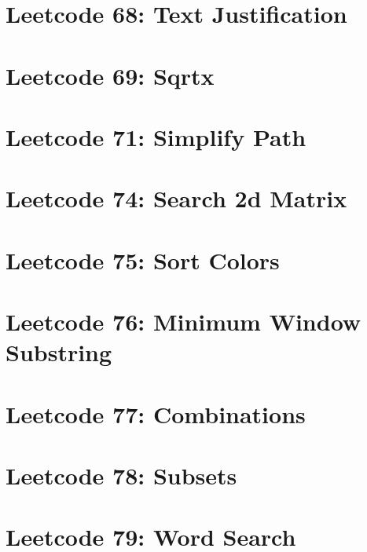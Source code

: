 \documentclass{article}
\begin{document}
\section*{Leetcode 68: Text Justification}

\pagebreak 

\section*{Leetcode 69: Sqrtx}

\pagebreak 

\section*{Leetcode 71: Simplify Path}

\pagebreak 

\section*{Leetcode 74: Search 2d Matrix}

\pagebreak 

\section*{Leetcode 75: Sort Colors}

\pagebreak 

\section*{Leetcode 76: Minimum Window Substring}

\pagebreak 

\section*{Leetcode 77: Combinations}

\pagebreak 

\section*{Leetcode 78: Subsets}

\pagebreak 

\section*{Leetcode 79: Word Search}

\pagebreak 
\end{document}
